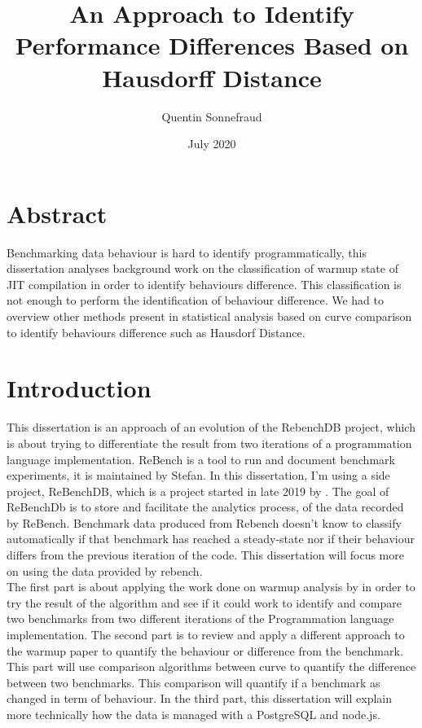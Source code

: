 \documentclass{article}
\title{An Approach to Identify Performance Differences Based on Hausdorff Distance}
\author{Quentin Sonnefraud}
\date{July 2020}
\begin{document}
\maketitle

\tableofcontents

\section{Abstract}

Benchmarking data behaviour is hard to identify programmatically, this dissertation analyses background work on the classification of warmup state of JIT compilation in order to identify behaviours difference. This classification is not enough to perform the identification of behaviour difference. We had to overview other methods present in statistical analysis based on curve comparison to identify behaviours difference such as Hausdorf Distance.

\section{Introduction}

This dissertation is an approach of an evolution of the RebenchDB project, which is about trying to differentiate the result from two iterations of a programmation language implementation. 
ReBench is a tool to run and document benchmark experiments, it is maintained by Stefan\citeauthor{ReBench:2018}. In this dissertation, I'm using a side project, ReBenchDB, which is a project started in late 2019 by \citeauthor{ReBench:2018}. The goal of ReBenchDb is to store and facilitate the analytics process, of the data recorded by ReBench. Benchmark data produced from Rebench doesn't know to classify automatically if that benchmark has reached a steady-state nor if their behaviour differs from the previous iteration of the code. This dissertation will focus more on using the data provided by rebench. \\ 
The first part is about applying the work done on warmup analysis by \citep{barrett2017virtual} in order to try the result of the algorithm and see if it could work to identify and compare two benchmarks from two different iterations of the Programmation language implementation.
The second part is to review and apply a different approach to the warmup paper to quantify the behaviour or difference from the benchmark. This part will use comparison algorithms between curve to quantify the difference between two benchmarks. This comparison will quantify if a benchmark as changed in term of behaviour. In the third part, this dissertation will explain more technically how the data is managed with a PostgreSQL and node.js.\\
\end{document}
